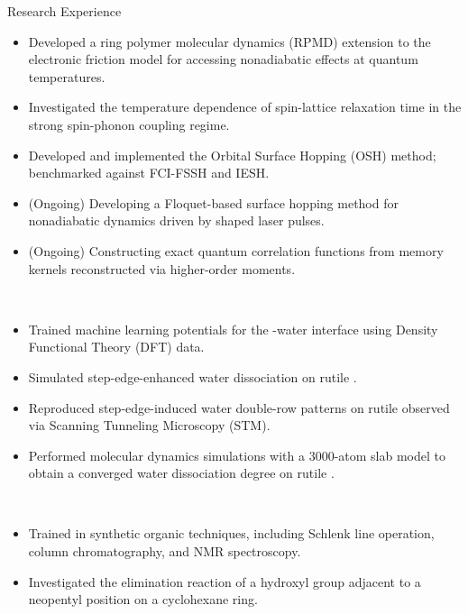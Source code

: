 \documentclass{resume}
\begin{document}
\begin{rSection}{Research Experience}
     \\
    \begin{itemize}[noitemsep, nosep]
        \item Developed a ring polymer molecular dynamics (RPMD) extension to the electronic friction model for accessing nonadiabatic effects at quantum temperatures.
        \item Investigated the temperature dependence of spin-lattice relaxation time in the strong spin-phonon coupling regime.
        \item Developed and implemented the Orbital Surface Hopping (OSH) method; benchmarked against FCI-FSSH and IESH.
        \item (Ongoing) Developing a Floquet-based surface hopping method for nonadiabatic dynamics driven by shaped laser pulses.
        \item (Ongoing) Constructing exact quantum correlation functions from memory kernels reconstructed via higher-order moments.
    \end{itemize}

     \\
    \begin{itemize}[noitemsep, nosep]
        \item Trained machine learning potentials for the -water interface using Density Functional Theory (DFT) data.  
        \item Simulated step-edge-enhanced water dissociation on rutile .  
        \item Reproduced step-edge-induced water double-row patterns on rutile  observed via Scanning Tunneling Microscopy (STM).  
        \item Performed molecular dynamics simulations with a 3000-atom slab model to obtain a converged water dissociation degree on rutile .  
    \end{itemize}

     \\
    \begin{itemize}[noitemsep, nosep]
        \item Trained in synthetic organic techniques, including Schlenk line operation, column chromatography, and NMR spectroscopy.  
        \item Investigated the elimination reaction of a hydroxyl group adjacent to a neopentyl position on a cyclohexane ring.
    \end{itemize}
\end{rSection}
\end{document}
